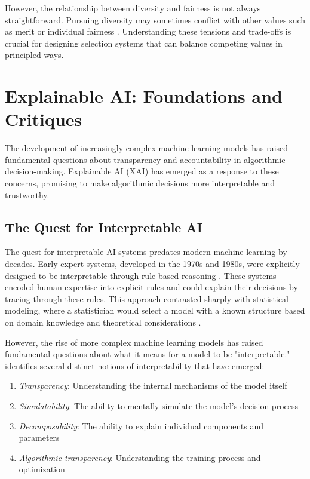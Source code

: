 However, the relationship between diversity and fairness is not always straightforward. Pursuing diversity may sometimes conflict with other values such as merit or individual fairness \cite{dwork_fairness_2012}. Understanding these tensions and trade-offs is crucial for designing selection systems that can balance competing values in principled ways.

\section{Explainable AI: Foundations and Critiques}\label{sec:xai_background}

The development of increasingly complex machine learning models has raised fundamental questions about transparency and accountability in algorithmic decision-making. Explainable AI (XAI) has emerged as a response to these concerns, promising to make algorithmic decisions more interpretable and trustworthy.

\subsection{The Quest for Interpretable AI}\label{ssec:interpretable_ai}
The quest for interpretable AI systems predates modern machine learning by decades. Early expert systems, developed in the 1970s and 1980s, were explicitly designed to be interpretable through rule-based reasoning \cite{shortliffe_mycin_1976}. These systems encoded human expertise into explicit rules and could explain their decisions by tracing through these rules. This approach contrasted sharply with statistical modeling, where a statistician would select a model with a known structure based on domain knowledge and theoretical considerations \cite{breiman_statistical_2001}.

However, the rise of more complex machine learning models has raised fundamental questions about what it means for a model to be "interpretable." \textcite{lipton_mythos_2018} identifies several distinct notions of interpretability that have emerged:

\begin{enumerate}
    \item \emph{Transparency}: Understanding the internal mechanisms of the model itself
    \item \emph{Simulatability}: The ability to mentally simulate the model's decision process
    \item \emph{Decomposability}: The ability to explain individual components and parameters
    \item \emph{Algorithmic transparency}: Understanding the training process and optimization
\end{enumerate}

